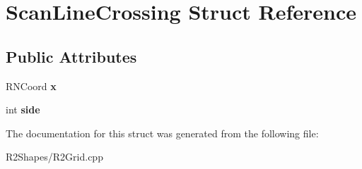 \hypertarget{struct_scan_line_crossing}{}\section{Scan\+Line\+Crossing Struct Reference}
\label{struct_scan_line_crossing}
\subsection*{Public Attributes}
\begin{DoxyCompactItemize}
\item 
R\+N\+Coord {\bfseries x}\hypertarget{struct_scan_line_crossing_acfe74451f03a849fa7ba51e14422a368}{}\label{struct_scan_line_crossing_acfe74451f03a849fa7ba51e14422a368}

\item 
int {\bfseries side}\hypertarget{struct_scan_line_crossing_a976100dd77ec3e837d31679d1559055a}{}\label{struct_scan_line_crossing_a976100dd77ec3e837d31679d1559055a}

\end{DoxyCompactItemize}


The documentation for this struct was generated from the following file\+:\begin{DoxyCompactItemize}
\item 
R2\+Shapes/R2\+Grid.\+cpp\end{DoxyCompactItemize}
